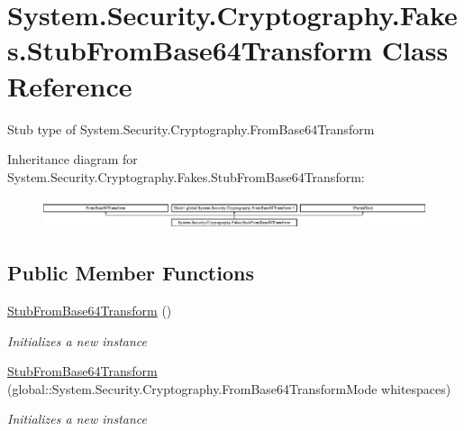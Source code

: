 \hypertarget{class_system_1_1_security_1_1_cryptography_1_1_fakes_1_1_stub_from_base64_transform}{\section{System.\-Security.\-Cryptography.\-Fakes.\-Stub\-From\-Base64\-Transform Class Reference}
\label{class_system_1_1_security_1_1_cryptography_1_1_fakes_1_1_stub_from_base64_transform}
}


Stub type of System.\-Security.\-Cryptography.\-From\-Base64\-Transform 


Inheritance diagram for System.\-Security.\-Cryptography.\-Fakes.\-Stub\-From\-Base64\-Transform\-:\begin{figure}[H]
\begin{center}
\leavevmode
\includegraphics[height=0.899598cm]{class_system_1_1_security_1_1_cryptography_1_1_fakes_1_1_stub_from_base64_transform}
\end{center}
\end{figure}
\subsection*{Public Member Functions}
\begin{DoxyCompactItemize}
\item 
\hyperlink{class_system_1_1_security_1_1_cryptography_1_1_fakes_1_1_stub_from_base64_transform_a0a30b6d479a90b8bfe37f0c92e576719}{Stub\-From\-Base64\-Transform} ()
\begin{DoxyCompactList}\small\item\em Initializes a new instance\end{DoxyCompactList}\item 
\hyperlink{class_system_1_1_security_1_1_cryptography_1_1_fakes_1_1_stub_from_base64_transform_a4980f1a800ee59322b4004b6f918dbba}{Stub\-From\-Base64\-Transform} (global\-::\-System.\-Security.\-Cryptography.\-From\-Base64\-Transform\-Mode whitespaces)
\begin{DoxyCompactList}\small\item\em Initializes a new instance\end{DoxyCompactList}\end{DoxyCompactItemize}
